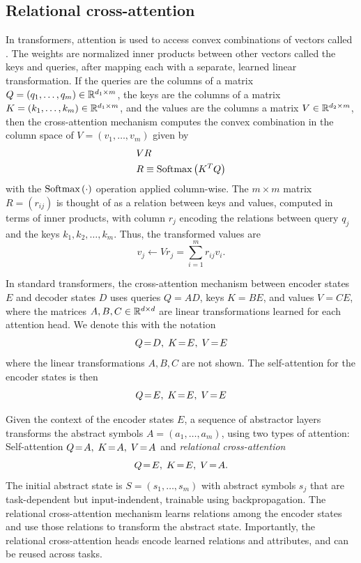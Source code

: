\subsection{Relational cross-attention}


In transformers, attention is used to access convex combinations of vectors called . The weights are normalized inner products between other vectors called the keys and queries, after mapping each with a separate, learned linear transformation. If the queries are the columns of a matrix $Q = (q_1,\ldots, q_m)\in\mathbb{R}^{d_1\times m}$, the keys are the columns of a matrix $K = (k_1, \ldots, k_m)\in\mathbb{R}^{d_1\times m}$, and the values are the columns a matrix $V\in\mathbb{R}^{d_2\times m}$, then the cross-attention mechanism computes the convex combination in the column space of $V = (v_1, \ldots, v_m)$ given by 
\begin{align*}
    & V R  \\
    & R \equiv \softmax{K^T Q}
\end{align*}
with  the $\mbox{Softmax}\left(\cdot\right)$ operation applied column-wise. The $m\times m$ matrix $R = (r_{ij})$ is thought of 
as a relation between keys and values, computed in terms of inner products, with column $r_j$ 
encoding the relations between query $q_j$ and the keys $k_1, k_2, \ldots, k_m$. Thus, the transformed 
values are 
\begin{equation*}
    v_j \leftarrow V r_j = \sum_{i=1}^m r_{ij} v_i .
\end{equation*}

In standard transformers, the cross-attention mechanism between encoder states $E$ and decoder states $D$
uses queries $Q = AD$, keys $K = BE$, and values $V = CE$, where the matrices $A,B,C \in\mathbb{R}^{d\times d}$ are 
linear transformations learned for each attention head.  We denote this with the notation 
\begin{equation*}
     \qkv{D}{E}{E}
\end{equation*}
where the linear transformations $A, B, C$ are not shown. The self-attention for the encoder 
states is then
\begin{equation*}
    \qkv{E}{E}{E}
\end{equation*}

Given the context of the encoder states $E$, a sequence of abstractor layers transforms the abstract symbols $A = (a_1,\ldots, a_m)$, using two types of attention: Self-attention $Q\!=\!A,\; K\!=\!A,\; V\!=\!A$ and 
\textit{relational cross-attention} 
\begin{equation*}
    \qkv{E}{E}{A}.
\end{equation*} 
The initial abstract state is $S = (s_1,\ldots, s_m)$ 
with abstract symbols $s_j$ that are task-dependent but input-indendent, trainable using 
backpropagation. The relational cross-attention mechanism learns relations among the encoder states and use those relations to transform the abstract state. Importantly, the relational cross-attention heads 
encode learned relations and attributes, and can be reused across tasks.


